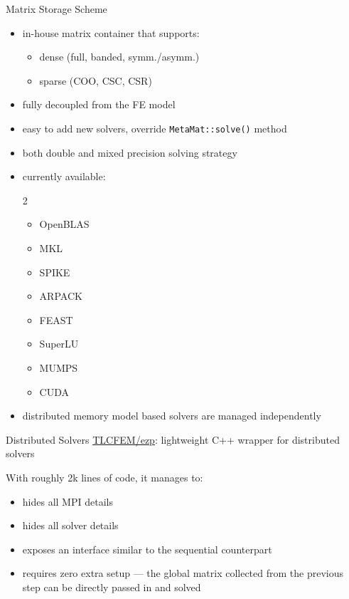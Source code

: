 \documentclass[fleqn,10pt]{beamer}
\begin{document}
\begin{frame}{Matrix Storage Scheme}
\begin{itemize}
\item in-house matrix container that supports:
\begin{itemize}
\item dense (full, banded, symm./asymm.)
\item sparse (COO, CSC, CSR)
\end{itemize}
\item fully decoupled from the FE model
\item easy to add new solvers, override \texttt{MetaMat::solve()} method
\item both double and mixed precision solving strategy
\item currently available:
\begin{multicols}{2}
\begin{itemize}
\item OpenBLAS
\item MKL
\item SPIKE
\item ARPACK
\item FEAST
\item SuperLU
\item MUMPS
\item CUDA
\end{itemize}
\end{multicols}
\item distributed memory model based solvers are managed independently
\end{itemize}
\end{frame}
\begin{frame}[containsverbatim]{Distributed Solvers}
\href{https://github.com/TLCFEM/ezp}{TLCFEM/ezp}: lightweight C++ wrapper for distributed solvers

With roughly 2k lines of code, it manages to:
\begin{itemize}
\item hides all MPI details
\item hides all solver details
\item exposes an interface similar to the sequential counterpart
\item requires zero extra setup --- the global matrix collected from the previous step can be directly passed in and solved
\end{itemize}
\end{frame}
\end{document}
